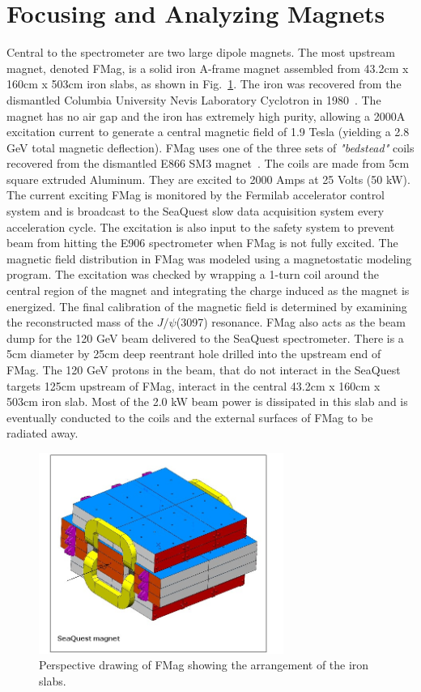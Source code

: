 \section{Focusing and Analyzing Magnets}


Central to the spectrometer are two large dipole magnets.  The most upstream magnet, denoted FMag, is a solid iron A-frame magnet assembled 
from 43.2cm x 160cm x 503cm iron slabs, as shown in Fig.~\ref{fig:FMag}. The iron was recovered from the dismantled Columbia University 
Nevis Laboratory Cyclotron in 1980~\cite{NevisCyclotron}.  The magnet has no air gap and the iron has extremely high purity, allowing a 
2000A excitation current to generate a central magnetic field of 1.9 Tesla (yielding a 2.8 GeV total magnetic deflection). FMag uses one 
of the three sets of \emph{"bedstead"} coils recovered from the dismantled E866 SM3 
magnet~\cite{PhysRevD.43.2815, PhysRevLett.64.2479, PhysRevLett.80.3715, Towell:2001nh}.  
The coils are made from 5cm square extruded Aluminum.  They are excited to 2000 Amps at 25 Volts (50 kW). 
 The current exciting FMag is monitored by the Fermilab accelerator control system and is broadcast to the SeaQuest slow data acquisition 
 system every acceleration cycle.  The excitation is also input to the safety system to prevent beam from hitting the E906 spectrometer when 
 FMag is not fully excited. The magnetic field distribution in FMag was modeled using a magnetostatic modeling program.  The excitation was 
 checked by wrapping a 1-turn coil around the central region of the magnet and integrating the charge induced as the magnet is energized.
 The final calibration of the magnetic field is determined by examining the reconstructed mass of the $J/\psi$(3097) resonance. FMag also acts 
 as the beam dump for the 120 GeV beam delivered to the SeaQuest spectrometer.  There is a 5cm diameter by 25cm deep reentrant hole drilled into 
 the upstream end of FMag.  The 120 GeV protons in the beam, that do not interact in the SeaQuest targets 125cm upstream of FMag, interact in the 
 central  43.2cm x 160cm x 503cm iron slab.  Most of the 2.0 kW beam power is dissipated in this slab and is eventually conducted to the coils and 
 the external surfaces of FMag to be radiated away.

\begin{figure}
	\centering
	\includegraphics[width=8cm]{figures/FMAG}
	\caption{Perspective drawing of FMag showing the arrangement of the iron slabs. \label{fig:FMag}}
\end{figure}

